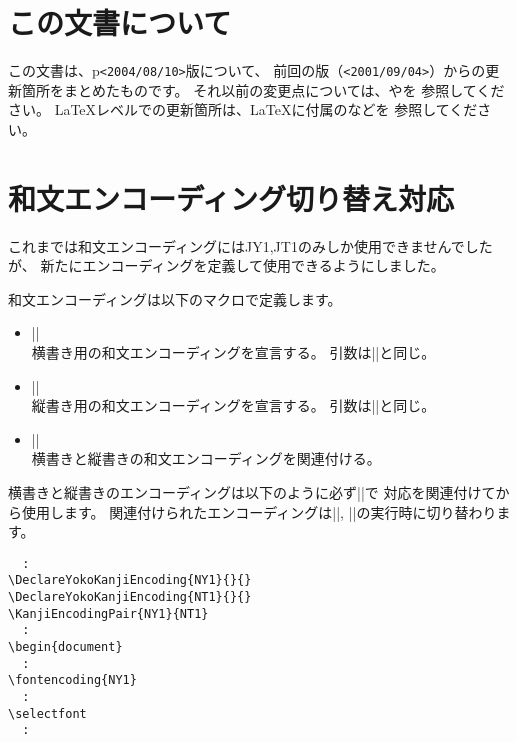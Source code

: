 \documentclass{plnews}
\author{田中 禎之（\texttt{<sada-t at ascii.co.jp>}）
}
\begin{document}
\maketitle

\section{この文書について}
この文書は、p\LaTeXe{}\texttt{<2004/08/10>}版について、
前回の版（\texttt{<2001/09/04>}）からの更新箇所をまとめたものです。
それ以前の変更点については、やを
参照してください。
\LaTeX{}レベルでの更新箇所は、\LaTeX{}に付属のなどを
参照してください。


\section{和文エンコーディング切り替え対応}
これまでは和文エンコーディングにはJY1,JT1のみしか使用できませんでしたが、
新たにエンコーディングを定義して使用できるようにしました。

和文エンコーディングは以下のマクロで定義します。

\begin{itemize}
\item ||\\
	横書き用の和文エンコーディングを宣言する。
	引数は|\DeclareFontEncoding|と同じ。
\item ||\\
	縦書き用の和文エンコーディングを宣言する。
	引数は|\DeclareFontEncoding|と同じ。
\item ||\\
	横書きと縦書きの和文エンコーディングを関連付ける。
\end{itemize}

横書きと縦書きのエンコーディングは以下のように必ず|\KanjiEncodingPair|で
対応を関連付けてから使用します。
関連付けられたエンコーディングは|\yoko|, |\tate|の実行時に切り替わります。

\begin{verbatim}
  :
\DeclareYokoKanjiEncoding{NY1}{}{}
\DeclareYokoKanjiEncoding{NT1}{}{}
\KanjiEncodingPair{NY1}{NT1}
  :
\begin{document}
  :
\fontencoding{NY1}
  :
\selectfont
  :
\end{verbatim}
\end{document}

